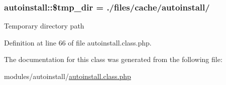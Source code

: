 \subsubsection[{\$tmp\+\_\+dir}]{\setlength{\rightskip}{0pt plus 5cm}autoinstall\+::\$tmp\+\_\+dir = \textquotesingle{}./files/cache/{\bf autoinstall}/\textquotesingle{}}\label{classautoinstall_a157882a0b8cc81818aa516880f2ba5dc}
Temporary directory path 

Definition at line 66 of file autoinstall.\+class.\+php.



The documentation for this class was generated from the following file\+:\begin{DoxyCompactItemize}
\item 
modules/autoinstall/\hyperlink{autoinstall_8class_8php}{autoinstall.\+class.\+php}\end{DoxyCompactItemize}
